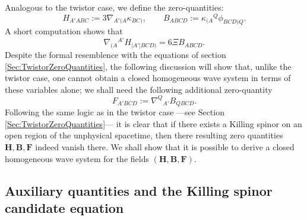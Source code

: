 \documentclass[10pt,a4paper]{article}
\theoremstyle{plain}
\def\bmB{{\bm B}}
\def\bmF{{\bm F}}
\def\bmH{{\bm H}}
\begin{document}
Analogous to the twistor case, we define the zero-quantities:
\begin{equation}\label{KS_zero_quantities1}
H_{A'ABC}:=3\nabla_{A'(A}\kappa_{BC)}, \qquad
B_{ABCD}:=\kappa_{(A}{}^Q\phi_{BCD)Q}.
\end{equation}
A short computation shows that
\begin{equation}
\nabla_{(A}{}^{A'}H_{\vert A'\vert BCD)} = 6\Xi
B_{ABCD}. \label{Eq:BuchdahlAsCurlOfH}
\end{equation}
Despite the formal resemblence with the equations of section
\ref{Sec:TwistorZeroQuantities}, the following discussion will show
that, unlike the twistor case, one cannot obtain a closed homogeneous
wave system in terms of these variables alone; we shall need the
following additional zero-quantity
\begin{equation}
 F_{A'BCD}:=\nabla^Q{}_{A'}B_{QBCD}.\label{Eq:DefZeroQuantityF}
\end{equation}
Following the same logic as in the twistor case ---see Section
\ref{Sec:TwistorZeroQuantities}--- it is clear that if there exists a Killing spinor on 
an open region of the unphysical spacetime, then there resulting zero quantities
$\bmH,\bmB,\bmF$ indeed vanish there.
We shall show that it is possible to derive a closed
homogeneous wave system for the fields $(\bmH, \bmB, \bmF)$.


\subsection{Auxiliary quantities and the Killing spinor candidate equation}
\end{document}
